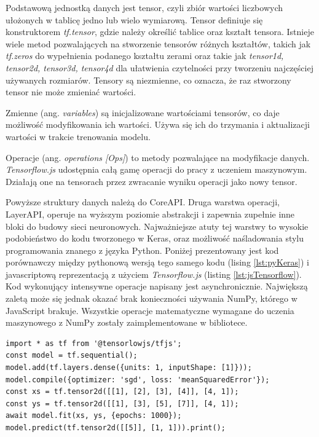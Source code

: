 \documentclass[12pt,a4paper,twoside,titlepage,openright]{book}
\begin{document}
\begin{itemize}
\begin{itemize}
Podstawową jednostką danych jest tensor, czyli zbiór wartości liczbowych ułożonych w tablicę jedno lub wielo wymiarową. Tensor definiuje się konstruktorem \textit{tf.tensor}, gdzie należy określić tablice oraz kształt tensora. Istnieje wiele metod pozwalających na stworzenie tensorów różnych kształtów, takich jak \textit{tf.zeros} do wypełnienia podanego kształtu zerami oraz takie jak \textit{tensor1d, tensor2d, tensor3d, tensor4d} dla ułatwienia czytelności przy tworzeniu najczęściej używanych rozmiarów.
Tensory są niezmienne, co oznacza, że raz stworzony tensor nie może zmieniać wartości. 

Zmienne (ang. \textit{variables}) są inicjalizowane wartościami tensorów, co daje możliwość modyfikowania ich wartości. Używa się ich do trzymania i aktualizacji wartości w trakcie trenowania modelu.

Operacje (ang. \textit{operations [Ops]}) to metody pozwalające na modyfikacje danych. \textit{Tensorflow.js} udostępnia całą gamę operacji do pracy z uczeniem maszynowym. Działają one na tensorach przez zwracanie wyniku operacji jako nowy tensor.

Powyższe struktury danych należą do CoreAPI. Druga warstwa operacji, LayerAPI, operuje na wyższym poziomie abstrakcji i zapewnia zupełnie inne bloki do budowy sieci neuronowych. Najważniejsze atuty tej warstwy to wysokie podobieństwo do kodu tworzonego w Keras, oraz możliwość naśladowania stylu programowania znanego z języka Python. Poniżej prezentowany jest kod porównawczy między pythonową wersją tego samego kodu (lising \ref{lst:pyKeras}) i javascriptową reprezentacją z użyciem \textit{Tensorflow.js} (listing \ref{lst:jsTensorflow}). Kod wykonujący intensywne operacje napisany jest asynchronicznie. Największą zaletą może się jednak okazać brak konieczności używania NumPy, którego w JavaScript brakuje. Wszystkie operacje matematyczne wymagane do uczenia maszynowego z NumPy zostały zaimplementowane w bibliotece. \cite{siteTensorflowJSConcepts}

\noindent
\begin{minipage}{\linewidth}
\begin{lstlisting}[caption=Proste operacje w JavaScript z Tensorflow.js, label=lst:jsTensorflow]
import * as tf from '@tensorlowjs/tfjs';
const model = tf.sequential();
model.add(tf.layers.dense({units: 1, inputShape: [1]}));
model.compile({optimizer: 'sgd', loss: 'meanSquaredError'});
const xs = tf.tensor2d([[1], [2], [3], [4]], [4, 1]);
const ys = tf.tensor2d([[1], [3], [5], [7]], [4, 1]);
await model.fit(xs, ys, {epochs: 1000});
model.predict(tf.tensor2d([[5]], [1, 1])).print();
\end{lstlisting}
\end{minipage}


\end{itemize}
\end{itemize}
\end{document}
